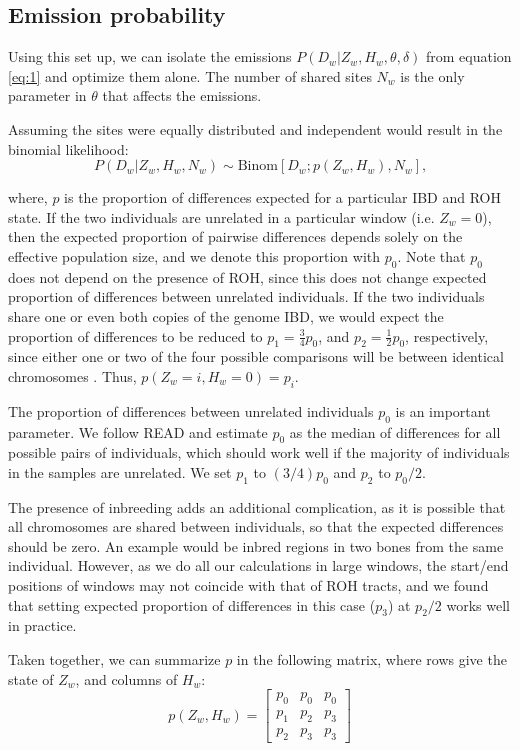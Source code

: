 \documentclass[12pt, letterpaper]{article}
\begin{document}
\subsection{Emission probability}\label{B}

Using this set up, we can isolate the emissions $P(D_w | Z_w, H_w ,\theta, \delta)$ from equation \ref{eq:1} and optimize them alone. The number of shared sites $N_w$ is the only parameter in $\theta$ that affects the emissions. 

Assuming the sites were equally distributed and independent would result in the binomial likelihood:
$$P(D_w|Z_w, H_w, N_w) \sim \text{Binom}[D_w ; p(Z_w, H_w), N_w] \text{,}$$

where, $p$ is the proportion of differences expected for a particular IBD and ROH state. If the two individuals are unrelated in a particular window (i.e. $Z_w = 0$), then the expected proportion of pairwise differences depends solely on the effective population size, and we denote this proportion with $p_0$. Note that $p_0$ does not depend on the presence of ROH, since this does not change expected proportion of differences between unrelated individuals. If the two individuals share one or even both copies of the genome IBD, we would expect the proportion of differences to be reduced to $p_1 = \frac{3}{4} p_0$, and $p_2 = \frac{1}2 p_0$, respectively, since either one or two of the four possible comparisons will be between identical chromosomes \cite{kuhn_estimating_2018}. Thus, $p(Z_w=i, H_w=0) = p_i$.

The proportion of differences between unrelated individuals $p_0$ is an important parameter. We follow READ \cite{kuhn_estimating_2018} and estimate $p_0$ as the median of differences for all possible pairs of individuals, which should work well if the majority of individuals in the samples are unrelated. We set $p_1$ to $(3/4)p_0$ and $p_2$ to $p_0/2$. 

The presence of inbreeding adds an additional complication, as it is possible that all chromosomes are shared between individuals, so that the expected differences should be zero. An example would be inbred regions in two bones from the same individual. However, as we do all our calculations in large windows, the start/end positions of windows may not coincide with that of ROH tracts, and we found that setting expected proportion of differences in this case ($p_3$) at $p_2/2$ works well in practice.


Taken together, we can summarize $p$ in the following matrix, where rows give the state of $Z_w$, and columns of $H_w$:
\begin{equation}\label{eq:2}
    p(Z_w, H_w) = \left[\begin{array}
{rrr}
p_0 & p_0 & p_0 \\
p_1 & p_2 & p_3 \\
p_2 & p_3 & p_3
\end{array}\right]
\end{equation}
\end{document}
